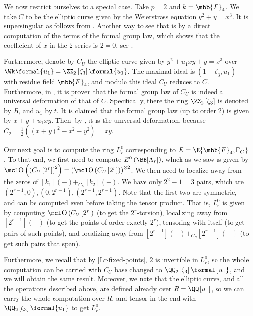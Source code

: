 We now restrict ourselves to a special case.
Take $p = 2$ and $k = \mbb{F}_4$.
We take $C$ to be the elliptic curve given by the Weierstrass equation $y^2 + y = x^3$.
It is supersingular as follows from \cite[exercise V.5.7 combined with proposition A.1.1.c]{Sil}.
Another way to see that is by a direct computation of the terms of the formal group law, which shows that the coefficient of $x$ in the $2$-series is $2=0$, see \cite[6.1.4]{Bea}.

Furthermore, denote by $C_U$ the elliptic curve given by $y^2 + u_1 xy + y = x^3$ over $\Wk\formal{u_1} = \ZZ_2\left[\zeta_3\right]\formal{u_1}$.
The maximal ideal is $\left(1-\zeta_3, u_1\right)$ with residue field $\mbb{F}_4$, and modulo this ideal $C_U$ reduces to $C$.
Furthermore, in \cite[3.5]{LT}, it is proven that the formal group law of $C_U$ is indeed a universal deformation of that of $C$.
Specifically, there the ring $\ZZ_2\left[\zeta_3\right]$ is denoted by $R$, and $u_1$ by $t$.
It is claimed that the formal group law (up to order 2) is given by $x+y+u_1 xy$.
Then, by \cite[1.1]{LT}, it is the universal deformation, because $C_2 = \frac{1}{2}\left(\left(x+y\right)^2-x^2-y^2\right)=xy$.

Our next goal is to compute the ring $L_r^0$ corresponding to $E = \E{\mbb{F}_4, \Gamma_C}$.
To that end, we first need to compute $E^0\left(\BB[\Lambda_r]\right)$, which as we saw is given by $\OO\left(\left(C_U\left[2^r\right]\right)^2\right) = \left(\OO\left(C_U\left[2^r\right]\right)\right)^{\otimes 2}$.
We then need to localize away from the zeros of $[k_1]\left(-\right) +_{C_U} [k_2]\left(-\right)$.
We have only $2^2-1=3$ pairs, which are $\left(2^{r-1},0\right), \left(0,2^{r-1}\right), \left(2^{r-1},2^{r-1}\right)$.
Note that the first two are symmetric, and can be computed even before taking the tensor product.
That is, $L_r^0$ is given by computing $\OO\left(C_U\left[2^r\right]\right)$ (to get the $2^r$-torsion), localizing away from $[2^{r-1}]\left(-\right)$ (to get the points of order exactly $2^r$), tensoring with itself (to get pairs of such points), and localizing away from $[2^{r-1}]\left(-\right) +_{C_U} [2^{r-1}]\left(-\right)$ (to get such pairs that span).

Furthermore, we recall that by \cref{Lr-fixed-points}, $2$ is invertible in $L_r^0$, so the whole computation can be carried with $C_U$ base changed to $\QQ_2\left[\zeta_3\right]\formal{u_1}$, and we will obtain the same result.
Moreover, we note that the elliptic curve, and all the operations described above, are defined already over $R = \QQ\left[u_1\right]$, so we can carry the whole computation over $R$, and tensor in the end with $\QQ_2\left[\zeta_3\right]\formal{u_1}$ to get $L_r^0$.



